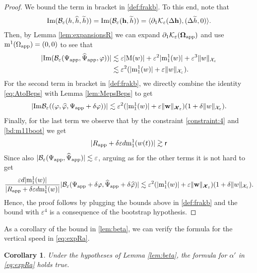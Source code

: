 \documentclass[11pt,reqno,a4paper]{amsart}
\def\eps{\varepsilon}
\def\de{{\partial}}
\def\Im{{\rm Im}}
\newcommand{\cB}{\mathcal{B}}
\newcommand{\cK}{\mathcal{K}}
\newcommand{\cX}{\mathcal{X}}
\newcommand{\mrm}{\mathrm{m}}
\newcommand{\mrM}{\mathrm{M}}
\newcommand{\1}{\mathbbm{1}}
\newtheorem{corollary}[proposition]{Corollary}
\theoremstyle{definition}
\theoremstyle{definition}
\numberwithin{equation}{section}
\begin{document}
\begin{proof}
We bound the term in bracket in \cref{def:frakb}. To this end, note that
     \begin{align}
    \label{eq:AtoBeps}
\Im(\cB_\eps(h,\widehat{h},\widetilde{h}))=\Im(\cB_{\eps}({\mathbf h},\widetilde{h}))=\langle \de_1\cK_\eps(\Delta{\mathbf h}),(\Delta\widetilde{h},0)\rangle.
    \end{align}
Then, by Lemma \ref{lem:expansionsR} we can expand $\de_1\cK_{\eps}(\boldsymbol{\Omega}_{\rm app})$ and use $\mrm^1(\Omega_{\rm app})=(0,0)$ to see that 
    \begin{align}
    |\Im(\cB_{\eps}(\Psi_{\rm app},\widehat{\Psi}_{\rm app}, \varphi))|&\lesssim \eps |\mrM(w)|+\eps^2|\mrm^1_1(w)|+\eps^3\|w\|_{\cX_\eps}\\
    &\lesssim \eps^2(|\mrm^1_1(w)|+ \eps\|w\|_{\cX_\eps}).
    \end{align}
For the second term in bracket in \cref{def:frakb}, we directly combine the identity \cref{eq:AtoBeps} with Lemma \ref{lem:MepsBeps} to get
\begin{align}
    |\Im\cB_{\eps}((\varphi,\widehat{\varphi},\Psi_{\rm app}+\delta \varphi))|\lesssim  \eps^2(|\mrm^1_1(w)|+\eps\|{\mathbf w}\|_{\boldsymbol{\cX}_\eps})(1+\delta \|w\|_{\cX_\eps}).
\end{align}
Finally, for the last term we observe that by the constraint \cref{constraint:4} and \cref{bd:m11boot} we get
\begin{align}
|R_{\rm app}+\delta \eps d \mrm^1_1(w(t))|\gtrsim \mathsf{r}
\end{align}
Since also $|\cB_{\eps}(\Psi_{\rm app},\widehat{\Psi}_{\rm app})|\lesssim \eps$, arguing as for the other terms it is not hard to get 
\begin{align}
    \frac{\eps d|\mrm^1_1(w)|}{|R_{\rm app}+\delta \eps d\mrm^1_1(w)|}|\cB_{\eps}(\Psi_{\rm app}+\delta \varphi,\widehat{\Psi}_{\rm app}+\delta \widehat{\varphi})|\lesssim  \eps^2(|\mrm^1_1(w)|+\eps\|{\mathbf w}\|_{\boldsymbol{\cX}_\eps})(1+\delta \|w\|_{\cX_\eps}).
\end{align}
Hence, the proof follows by plugging the bounds above in \cref{def:frakb} and the bound with $\eps^4$ is a consequence of the bootstrap hypothesis.
\end{proof}
As a corollary of the bound in \cref{lem:beta}, we can verify the formula for the vertical speed in \cref{eq:expRa}.
\begin{corollary}
\label{cor:alpha}
    Under the hypotheses of Lemma \ref{lem:beta}, the formula for $\alpha'$ in \cref{eq:expRa} holds true.
\end{corollary}
\end{document}
